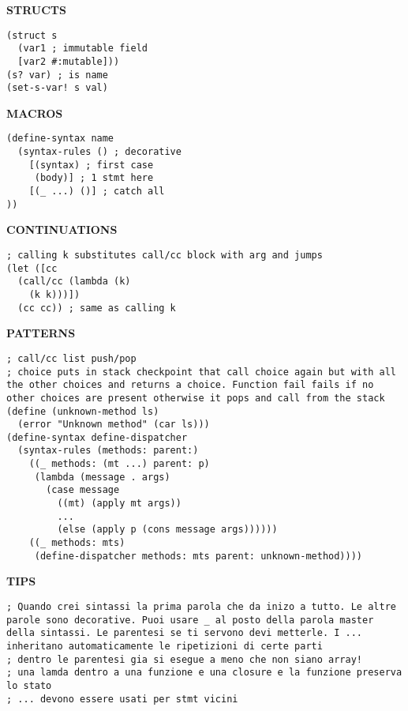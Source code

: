 \documentclass{article}
\begin{document}
\begin{multicols*}{3}
\hrulefill

\textbf{STRUCTS}
\begin{lstlisting}
(struct s
  (var1 ; immutable field
  [var2 #:mutable]))
(s? var) ; is name
(set-s-var! s val)
\end{lstlisting}

\hrulefill

\textbf{MACROS}
\begin{lstlisting}
(define-syntax name
  (syntax-rules () ; decorative
    [(syntax) ; first case
     (body)] ; 1 stmt here
    [(_ ...) ()] ; catch all
))
\end{lstlisting}

\hrulefill

\textbf{CONTINUATIONS}
\begin{lstlisting}
; calling k substitutes call/cc block with arg and jumps
(let ([cc 
  (call/cc (lambda (k)
    (k k)))])
  (cc cc)) ; same as calling k
\end{lstlisting}

\hrulefill

\textbf{PATTERNS}
\begin{lstlisting}
; call/cc list push/pop
; choice puts in stack checkpoint that call choice again but with all the other choices and returns a choice. Function fail fails if no other choices are present otherwise it pops and call from the stack
(define (unknown-method ls)
  (error "Unknown method" (car ls)))
(define-syntax define-dispatcher
  (syntax-rules (methods: parent:)
    ((_ methods: (mt ...) parent: p)
     (lambda (message . args)
       (case message
         ((mt) (apply mt args))
         ...
         (else (apply p (cons message args))))))
    ((_ methods: mts)
     (define-dispatcher methods: mts parent: unknown-method))))
\end{lstlisting}

\hrulefill

\textbf{TIPS}
\begin{lstlisting}
; Quando crei sintassi la prima parola che da inizo a tutto. Le altre parole sono decorative. Puoi usare _ al posto della parola master della sintassi. Le parentesi se ti servono devi metterle. I ... inheritano automaticamente le ripetizioni di certe parti
; dentro le parentesi gia si esegue a meno che non siano array!
; una lamda dentro a una funzione e una closure e la funzione preserva lo stato
; ... devono essere usati per stmt vicini
\end{lstlisting}

\end{multicols*}
\end{document}
